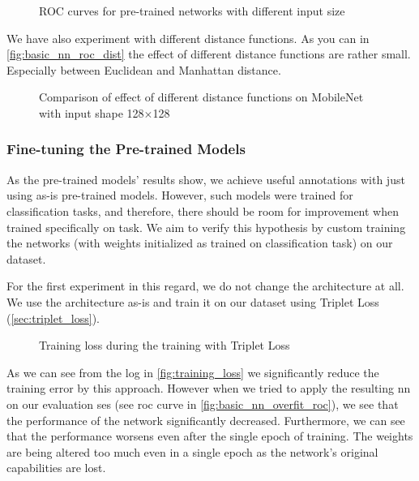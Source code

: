 \begin{figure}
    \centering
    \def\svgwidth{\columnwidth}
    
    \caption{ROC curves for pre-trained networks with different input size}
    \label{fig:pretrained_nn_roc}
\end{figure}

We have also experiment with different distance functions. As you can in \autoref{fig:basic_nn_roc_dist} the effect of different distance functions are rather small. Especially between Euclidean and Manhattan distance.

\begin{figure}
    \centering
    \def\svgwidth{\columnwidth}
    
    \caption{Comparison of effect of different distance functions on MobileNet with input shape 128$\times$128}
    \label{fig:basic_nn_roc_dist}
\end{figure}

\subsubsection{Fine-tuning the Pre-trained Models}

As the pre-trained models' results show, we achieve useful annotations with just using as-is pre-trained models. However, such models were trained for classification tasks, and therefore, there should be room for improvement when trained specifically on \reid{} task. We aim to verify this hypothesis by custom training the networks (with weights initialized as trained on classification task) on our dataset.

For the first experiment in this regard, we do not change the architecture at all. We use the architecture as-is and train it on our dataset using Triplet Loss (\autoref{sec:triplet_loss}).

\begin{figure}
    \centering
    \def\svgwidth{\columnwidth}
    \large
    \scalebox{0.8}{}
    \caption{Training loss during the training with Triplet Loss}
    \label{fig:training_loss}
\end{figure}

As we can see from the log in \autoref{fig:training_loss} we significantly reduce the training error by this approach. However when we tried to apply the resulting \gls{nn} on our evaluation \gls{ses} (see \gls{roc} curve in \autoref{fig:basic_nn_overfit_roc}), we see that the performance of the network significantly decreased. Furthermore, we can see that the performance worsens even after the single epoch of training. The weights are being altered too much even in a single epoch as the network's original capabilities are lost.

